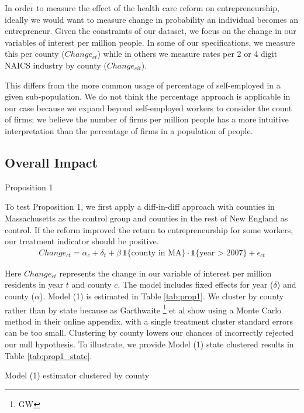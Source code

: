 \documentclass[12pt]{article}
\begin{document}
In order to measure the effect of the health care reform on entrepreneurship, ideally we would want to measure change in probability an individual becomes an entrepreneur. Given the constraints of our dataset, we focus on the change in our variables of interest per million people. In some of our specifications, we measure this per county ($Change_{ct}$) while in others we measure rates per 2 or 4 digit NAICS industry by county ($Change_{cit}$). 

This differs from the more common usage of percentage of self-employed in a given sub-population. We do not think the percentage approach is applicable in our case because we expand beyond self-employed workers to consider the count of firms; we believe the number of firms per million people has a more intuitive interpretation than the percentage of firms in a population of people. 

\subsection{Overall Impact}

Proposition 1  

To test Proposition 1, we first apply a diff-in-diff approach with counties in Massachusetts as the control group and counties in the rest of New England as control. If the reform improved the return to entrepreneurship for some workers, our treatment indicator should be positive. 
\begin{align}
Change_{ct} = \alpha_c + \delta_t + \beta \, \mathbf{1}\{\text{county in MA}\} \cdot \mathbf{1}\{\text{year > 2007}\} + \epsilon_{ct}
\end{align}

Here $Change_{ct}$ represents the change in our variable of interest per million residents in year $t$ and county $c$. The model includes fixed effects for year ($\delta$) and county ($\alpha$). Model (1) is estimated in Table \ref{tab:prop1}. We cluster by county rather than by state because as Garthwaite \footnote{GW} et al show using a Monte Carlo method in their online appendix, with a single treatment cluster standard errors can be too small. Clustering by county lowers our chances of incorrectly rejected our null hypothesis. To illustrate, we provide Model (1) state clustered results in Table \ref{tab:prop1_state}. 

\begin{center}
	\begin{table}[H]
		\centering
		\caption{Model (1) estimator clustered by county} 
			
		\label{tab:prop1}
	\end{table}		
\end{center}
\end{document}
